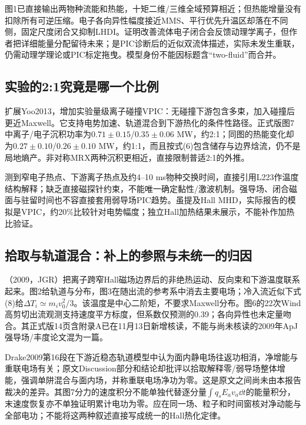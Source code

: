 \documentclass[UTF8,a4paper,11pt,openany,fontset=fandol]{ctexbook}
\begin{document}
\citet{TenBarge2019MMS}图1已直接输出两物种流能和热能，十矩二维/三维全域预算相近；但热能增量没有扣除所有可逆压缩。电子各向异性幅度接近MMS、平行优先升温区却落在不同侧，固定尺度闭合又抑制LHDI。\citet{Finelli2021}证明改善流体电子闭合会反馈动理学离子，但作者把详细能量分配留待未来；\citet{Che2014Buneman}是PIC诊断后的近似双流体描述，实际未发生重联，仍需动理学理论或PIC标定拖曳。模型身份不能因标题含“two-fluid”而合并。

\subsection{实验的2:1究竟是哪一个比例}
\citet{F679}扩展Yoo2013，增加实验量级离子碰撞VPIC：无碰撞下游包含多束，加入碰撞后更近Maxwell。它支持电势加速、轨道混合到下游热化的条件性路径。\citet{F674}正式版图7中离子/电子沉积功率为$0.71\pm0.15$/$0.35\pm0.06$ MW，约2:1；同图的热能变化却为$0.27\pm0.10$/$0.26\pm0.10$ MW，约1:1，而且按式(6)包含储存与边界焓流，仍不是局地熵产。\citet{Yoo2017Heating}非对称MRX两种沉积更相近，直接限制普适2:1的外推。

\citet{Tanabe2015MAST}测到窄电子热点、下游离子热点及约4--10 ms物种交换时间，直接引用L223作温度结构解释；缺乏直接磁探针约束，不能唯一确定黏性/激波机制。强导场、闭合磁面与驻留时间也不容直接套用弱导场PIC趋势。\citet{TS6FEC2025}虽提及Hall MHD，实际报告的模拟是VPIC，约20\%比较针对电势幅度；独立Hall加热结果未展示，不能补作加热比验证。

\subsection{拾取与轨道混合：补上的参照与未统一的归因}
\citet{Drake2009Pickup}（2009，JGR）把离子跨窄Hall磁场边界后的非绝热运动、反向束和下游温度联系起来。图2给轨道与分布，图3在随出流的参考系中消去主要电场；冷入流近似下式(8)给$\Delta T_i\simeq m_iv_0^2/3$。该温度是中心二阶矩，不要求Maxwell分布。图6的22次Wind高剪切出流观测支持速度平方标度，但系数仅预测的0.39；各向异性也未定量吻合。其正式版14页含附录A已在11月13日新增核读，不能与尚未核读的2009年ApJ强导场/丰度论文混为一篇。

Drake2009第16段在下游近稳态轨道模型中认为面内静电场往返功相消，净增能与重联电场有关；\citet{Yoon2023PhaseSpace}原文Discussion部分和结论却批评以拾取解释零/弱导场整体增能，强调单阱混合与面内场，并称重联电场净功为零。这是原文之间尚未由本报告裁决的差异。其图7分力的速度积分不能单独代替逐分量$\int q_sE_av_a\dd t$的能量积分，末速度恢复亦不单独证明累计电功为零。应在同一场、粒子和时间窗核对净动能与全部电功；不能将这两种叙述直接写成统一的Hall热化定律。
\end{document}
